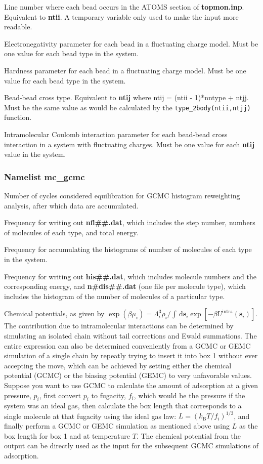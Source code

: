 \documentclass[12pt,letterpaper]{article}
\begin{document}
 Line number where each bead occurs in the ATOMS section 
of {\bf topmon.inp}. Equivalent to {\bf ntii}.
A temporary variable only used to make the input more readable.

 Electronegativity parameter for each bead in a fluctuating charge
model. Must be one value for each bead type in the system.

 Hardness parameter for each bead in a fluctuating charge
model. Must be one value for each bead type in the system.

 Bead-bead cross type. Equivalent to {\bf ntij} where
ntij = (ntii - 1)*nntype + ntjj. Must be the same value as would be calculated by the
{\tt type\_2body(ntii,ntjj)} function. 

 Intramolecular Coulomb interaction parameter for each 
bead-bead cross interaction in a system with fluctuating charges. 
Must be one value for each {\bf ntij} value in the system.

\subsubsection{Namelist \textbf{mc\_gcmc}}
 Number of cycles considered
equilibration for GCMC histogram reweighting analysis, after
which data are accumulated.

 Frequency for writing out {\bf
  nfl\#\#.dat}, which includes the step number, numbers of
molecules of each type, and total energy.

 Frequency for accumulating the
histograms of number of molecules of each type in the
system.

 Frequency for writing out {\bf
  his\#\#.dat}, which includes molecule numbers and the
corresponding energy, and {\bf n\#dis\#\#.dat} (one file per
molecule type), which includes the histogram of the number
of molecules of a particular type.

 Chemical potentials, as given by
$\exp(\beta\mu_i)=\Lambda_i^3\rho_i/\int\,\mathrm{d}\mathbf{s}_i\exp[-\beta U^{\text{intra}}(\mathbf{s}_i)]$.
The contribution due to intramolecular interactions can be
determined by simulating an isolated chain without tail
corrections and Ewald summations. The entire expression can
also be determined conveniently from a GCMC or GEMC
simulation of a single chain by repeatly trying to insert it
into box 1 without ever accepting the move, which can be
achieved by setting either the chemical potential (GCMC) or
the biasing potential (GEMC) to very unfavorable values.
Suppose you want to use GCMC to calculate the amount of
adsorption at a given pressure, $p_i$, first convert $p_i$
to fugacity, $f_i$, which would be the pressure if the
system was an ideal gas, then calculate the box length that
corresponds to a single molecule at that fugacity using the
ideal gas law: $L=(k_{\text{B}}T/f_i)^{1/3}$, and finally
perform a GCMC or GEMC simulation as mentioned above using
$L$ as the box length for box 1 and at temperature $T$. The
chemical potential from the output can be directly used as
the input for the subsequent GCMC simulations of adsorption.
\end{document}
